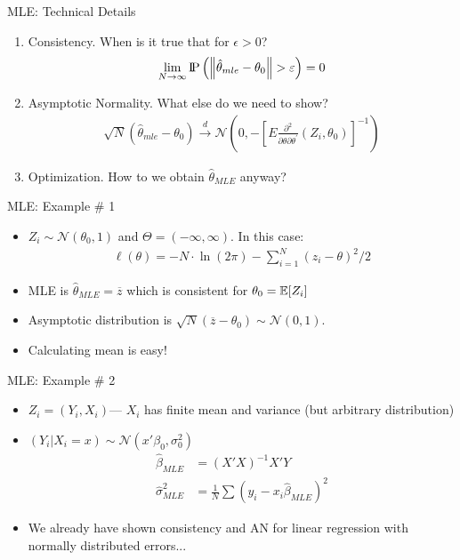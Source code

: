 \begin{frame}{MLE: Technical Details}
\begin{enumerate}
\item Consistency. When is it true that for $\epsilon>0$?
\begin{align*}
\lim _ { N \rightarrow \infty } \text{I\kern-0.15em P} \left( \left\| \hat { \theta } _ { m l e } - \theta _ { 0 } \right\| > \varepsilon \right) = 0
\end{align*}
\item Asymptotic Normality. What else do we need to show?
\begin{align*}
\sqrt { N } \left( \hat { \theta } _ { m l e } - \theta _ { 0 } \right) \stackrel { d } { \longrightarrow } \mathcal { N } \left( 0 , - \left[ E \frac { \partial ^ { 2 } } { \partial \theta \partial \theta ^ { \prime } } \left( Z _ { i } , \theta _ { 0 } \right) \right] ^ { - 1 } \right)
\end{align*}
\item Optimization. How to we obtain $\widehat{\theta}_{MLE}$ anyway?
\end{enumerate}
\end{frame}


\begin{frame}{MLE: Example \# 1}
\begin{itemize}
\item $Z_i \sim \mathcal{N}(\theta_0,1)$ and $\Theta = (-\infty,\infty)$. In this case:
\begin{align*}
\ell ( \theta ) = - N \cdot \ln ( 2 \pi ) - \sum _ { i = 1 } ^ { N } \left( z _ { i } - \theta \right) ^ { 2 } / 2
\end{align*}
\item MLE is $\widehat{\theta}_{MLE}=\overline{z}$ which is consistent for $\theta_0 = \mathbb{E}[Z_i]$
\item Asymptotic distribution is $\sqrt{N} ( \overline{z}-\theta_0) \sim \mathcal{N}(0,1)$.
\item Calculating mean is easy!
\end{itemize}
\end{frame}




\begin{frame}{MLE: Example \# 2}
\begin{itemize}
\item $Z_i = (Y_i, X_i)$---   $X_i$ has finite mean and variance (but arbitrary distribution)
\item $(Y_i | X_i  =x) \sim  \mathcal{N}(x' \beta_0, \sigma_0^2)$
\begin{align*}
\widehat{\beta}_{MLE} &= (X'X)^{-1} X'Y\\
\widehat{\sigma}^2_{MLE} &= \frac{1}{N} \sum (y_i - x_i \widehat{\beta}_{MLE})^2
\end{align*}
\item We already have shown consistency and AN for linear regression with normally distributed errors...
\end{itemize}
\end{frame}


